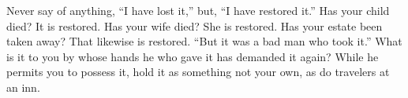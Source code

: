 Never say of anything, ``I have lost it,'' but, ``I have restored it.'' Has
your child died? It is restored. Has your wife died? She is restored. Has
your estate been taken away? That likewise is restored. ``But it was a bad
man who took it.'' What is it to you by whose hands he who gave it has
demanded it again? While he permits you to possess it, hold it as
something not your own, as do travelers at an inn.
